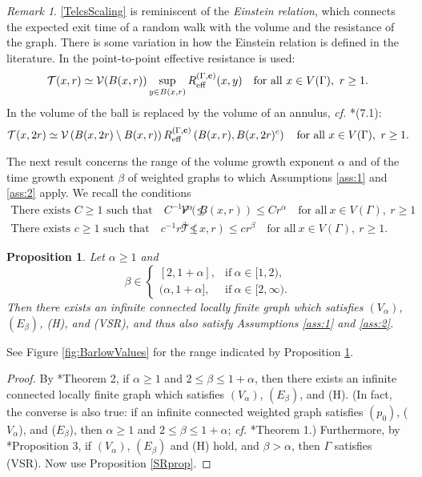 \documentclass[11pt]{amsart}
\theoremstyle{plain}
\newtheorem{proposition}[lemma]{Proposition}
\theoremstyle{definition}
\theoremstyle{remark}
\newtheorem{remark}[lemma]{Remark}
\begin{document}
\begin{remark}
\eqref{TelcsScaling} is reminiscent of the \emph{Einstein relation}, which connects the expected exit time of a random walk with the volume and the resistance of the graph. There is some variation in how the Einstein relation is defined in the literature. In \cite{KigamiMemoir} the point-to-point effective resistance is used:
\[
\mathcal{T}(x,r) \simeq  \mathcal{V}(B(x,r))\sup_{y\in B(x,r)} R_{\rm eff}^{(\Gamma,{\bf c})}(x,y) \quad \text{for all}~x\in V(\Gamma), ~r\geq 1.
\]
 In \cite{TelcsBook} the volume of the ball is replaced by the volume of an annulus, \emph{cf.\@} \cite{TelcsBook}*{(7.1)}:
\[
\mathcal{T}(x, 2r) \simeq \mathcal{V}\left(B(x,2r) \setminus B(x,r)\right) R_{\rm eff}^{(\Gamma, {\bf c})}\left(B(x,r), B(x,2r)^c\right) \quad \text{for all}~x\in V(\Gamma),~r\geq 1.
\]
\end{remark}

The next result concerns the range of the volume growth exponent $\alpha$ and of the time growth exponent $\beta$ of weighted graphs to which Assumptions \ref{ass:1} and \ref{ass:2} apply. We recall the conditions
\begin{align}
\tag{$V_\alpha$} \text{There exists $C\geq 1$ such that} \quad  C^{-1} r^\alpha \leq &\mathcal{V}(B(x,r)) \leq C r^\alpha \quad \text{for all}~x\in V(\Gamma), ~r\geq 1\\
\tag{$E_\beta$} \text{There exists $c\geq 1$ such that} \quad  c^{-1} r^\beta \leq &\mathcal{T}(x,r)\leq c r^\beta \quad \text{for all}~ x\in V(\Gamma), ~r\geq 1.
\end{align}

\begin{proposition}
\label{prop:BarlowValues}
Let $\alpha \geq 1$ and 
\[
\beta \in \left\{\begin{array}{ll} [2, 1+\alpha], & \text{if}~\alpha \in [1,2),\\ (\alpha, 1+\alpha], &\text{if}~\alpha \in [2,\infty).\end{array} \right.
\]
Then there exists an infinite connected locally finite graph which satisfies $(V_\alpha)$, $(E_\beta)$, (H), and (VSR), and thus also satisfy Assumptions \ref{ass:1} and \ref{ass:2}.
\end{proposition}

See Figure \ref{fig:BarlowValues} for the range indicated by Proposition \ref{prop:BarlowValues}.

\begin{proof}
By \cite{BarlowValues}*{Theorem 2}, if $\alpha\geq 1$ and $2\leq \beta \leq 1+\alpha$, then there exists an infinite connected locally finite graph which satisfies $(V_\alpha)$, $(E_\beta)$, and (H). (In fact, the converse is also true: if an infinite connected weighted graph satisfies $(p_0)$, ($V_\alpha$), and ($E_\beta$), then $\alpha\geq 1$ and $2\leq \beta \leq 1+\alpha$; \emph{cf.\@} \cite{BarlowValues}*{Theorem 1}.) Furthermore, by \cite{BarlowValues}*{Proposition 3}, if $(V_\alpha)$, $(E_\beta)$ and (H) hold, and $\beta>\alpha$, then $\Gamma$ satisfies (VSR). Now use Proposition \ref{SRprop}.
\end{proof}
\end{document}
